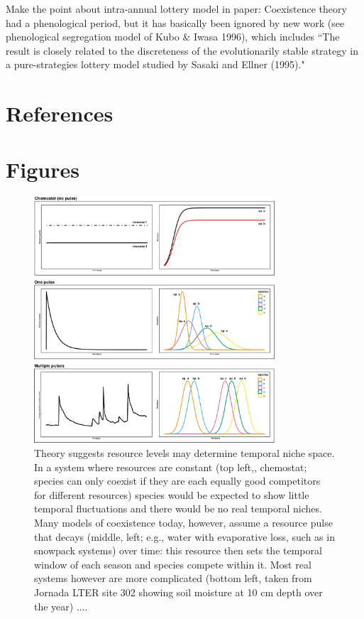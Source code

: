 \documentclass[11pt]{article}
\begin{document}
Make the point about intra-annual lottery model in paper: Coexistence theory had a phenological period, but it has basically been ignored by new work (see phenological segregation model of Kubo \& Iwasa 1996), which includes ``The result is closely related to the discreteness of the evolutionarily stable strategy in a pure-strategies lottery model studied by Sasaki and Ellner (1995)." 

\newpage
\section{References}


\newpage
\section{Figures}


\begin{figure}[h!]
\centering
\includegraphics[width=0.8\textwidth]{..//figures/JN_conceptfigs/sixpanel_concept.png}
\caption{Theory suggests resource levels may determine temporal niche space. In a system where resources are constant (top left,, chemostat; species can only coexist if they are each equally good competitors for different resources) species would be expected to show little temporal fluctuations and there would be no real temporal niches. Many models of coexistence today, however, assume a resource pulse that decays (middle, left; e.g., water with evaporative loss, such as in snowpack systems) over time: this resource then sets the temporal window of each season and species compete within it. Most real systems however are more complicated (bottom left, taken from Jornada LTER site 302 showing soil moisture at 10 cm depth over the year) ....} 
 \label{fig:resource}
\end{figure}
\end{document}
